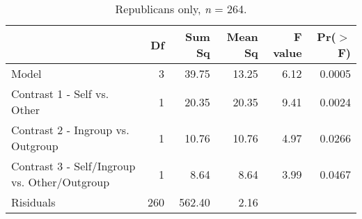 \documentclass[12pt,]{article}
\begin{document}
\vspace{0.6cm}

\begin{table}[ht]
\centering
\begin{tabular}{lrrrrr}
  \hline
 & Df & Sum Sq & Mean Sq & F value & Pr($>$F) \\ 
  \hline
Model & 3 & 39.75 & 13.25 & 6.12 & 0.0005 \\ 
  Contrast 1 - Self vs. Other & 1 & 20.35 & 20.35 & 9.41 & 0.0024 \\ 
  Contrast 2 - Ingroup vs. Outgroup & 1 & 10.76 & 10.76 & 4.97 & 0.0266 \\ 
  Contrast 3 - Self/Ingroup vs. Other/Outgroup & 1 & 8.64 & 8.64 & 3.99 & 0.0467 \\ 
  Risiduals & 260 & 562.40 & 2.16 &  &  \\ 
   \hline
\end{tabular}
\caption{Republicans only, \emph{n} = 264. } 
\label{reps2}
\end{table}
\end{document}

